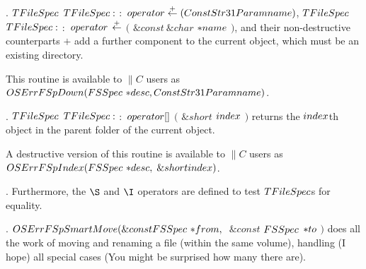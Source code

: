 \fi

. \CD{}$\\{TFileSpec}$ $\\{TFileSpec}:$ $:$ $\\{operator}\buildrel+\over{%
\leftarrow}(\\{ConstStr31Param}\ \\{name})$\DC{},
\CD{}$\\{TFileSpec}$ $\\{TFileSpec}:$ $:$ $\\{operator}$ $\buildrel+\over{%
\leftarrow}$ $($ $\&{const}\ \&{char}$ ${{*}}\\{name}$ $)$\DC{}, and their
non-destructive
counterparts \CD{}$+$\DC{} add a further component to the current object, which
must be
an existing directory.

This routine is available to \CD{}$\|C$\DC{} users as
\CD{}$\\{OSErr}\ \\{FSpDown}(\\{FSSpec}\ {{*}}\\{desc},\;\\{ConstStr31Param}\ %
\\{name})$\DC{}.

\fi

. \CD{}$\\{TFileSpec}$ $\\{TFileSpec}:$ $:$ $\\{operator}[]$ $($ $%
\&{short}$ $\\{index}$ $)$\DC{} returns the \CD{}$\\{index}$\DC{}th object in
the parent folder of the current object.

A destructive version of this routine is available to \CD{}$\|C$\DC{} users as
\CD{}$\\{OSErr}\ \\{FSpIndex}(\\{FSSpec}\ {{*}}\\{desc},\;\&{short}\ %
\\{index})$\DC{}.

\fi

. Furthermore, the \CD{}$\S$\DC{} and \CD{}$\I$\DC{} operators are defined
to test \CD{}$\\{TFileSpec}$\DC{}s for
equality.

\fi

. \CD{}$\\{OSErr}\ \\{FSpSmartMove}(\&{const}\ \\{FSSpec}\ {{*}}\\{from},%
\;$ $\&{const}$ $\\{FSSpec}$ ${{*}}\\{to}$ $)$\DC{} does all the work
of moving and renaming a file (within the same volume), handling (I hope) all
special cases (You might be surprised how many there are).

